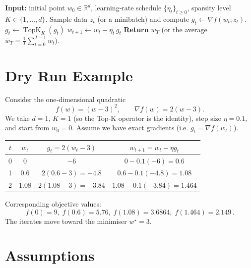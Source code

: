 \documentclass{article}
\newcommand{\TopK}{\operatorname{TopK}}
\newcommand{\RR}{\mathbb{R}}
\begin{document}
\begin{algorithm}[H]
\caption{Top‑K SGD}
\begin{algorithmic}[1]
\State \textbf{Input:} initial point $w_0\in\RR^d$, learning‑rate schedule
$\{\eta_t\}_{t\ge0}$, sparsity level $K\in\{1,\dots,d\}$.
    \State Sample data $z_t$ (or a minibatch) and compute
    $g_t\gets\nabla f(w_t;z_t)$.
    \State $\displaystyle \tilde g_t \gets \TopK_K(g_t)$
    \State $w_{t+1}\gets w_t-\eta_t\,\tilde g_t$
\EndFor
\State \textbf{Return} $w_T$ (or the average $\bar w_T=\frac1T\sum_{t=0}^{T-1}w_t$).
\end{algorithmic}
\end{algorithm}

\section*{Dry Run Example}

Consider the one‑dimensional quadratic
\[
f(w)=(w-3)^2,\qquad \nabla f(w)=2(w-3).
\]
We take $d=1$, $K=1$ (so the Top‑K operator is the identity), step size
$\eta=0.1$, and start from $w_0=0$.
Assume we have exact gradients (i.e. $g_t=\nabla f(w_t)$).

\begin{center}
\begin{tabular}{c|c|c|c}
$t$ & $w_t$ & $g_t=2(w_t-3)$ & $w_{t+1}=w_t-\eta g_t$ \\ \hline
0 & $0$ & $-6$ & $0-0.1(-6)=0.6$ \\
1 & $0.6$ & $2(0.6-3)=-4.8$ & $0.6-0.1(-4.8)=1.08$ \\
2 & $1.08$ & $2(1.08-3)=-3.84$ & $1.08-0.1(-3.84)=1.464$ \\
\end{tabular}
\end{center}

Corresponding objective values:
\[
f(0)=9,\; f(0.6)=5.76,\; f(1.08)=3.6864,\; f(1.464)=2.149\, .
\]
The iterates move toward the minimiser $w^\star=3$.

\section*{Assumptions}
\end{document}
